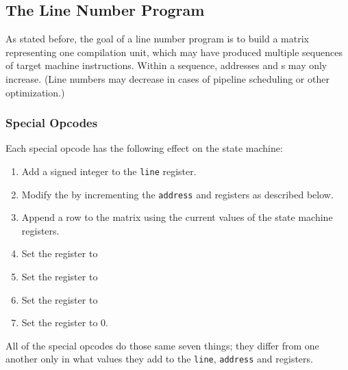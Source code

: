 \subsection{The Line Number Program}
\label{chap:linenumberprogram}
As stated before, the goal of a line number program is to build
a matrix representing one compilation unit, which may have
produced multiple sequences of target machine instructions.
Within a sequence, addresses and 
s may only increase. 
(Line numbers may decrease in cases of pipeline
scheduling or other optimization.)

\subsubsection{Special Opcodes} 
\label{chap:specialopcodes}
Each \HFTubyte{} special opcode has the following effect on the state machine:

\begin{enumerate}[1. ]

\item  Add a signed integer to the \texttt{line} register.

\item  Modify the  by incrementing the
\texttt{address} and  registers as described below.

\item  Append a row to the matrix using the current values
of the state machine registers.

\item  Set the  register to  
\item  Set the  register to 
\item  Set the  register to 
\item  Set the  register to 0.

\end{enumerate}

All of the special opcodes do those same seven things; they
differ from one another only in what values they add to the
\texttt{line}, \texttt{address} and  registers.


